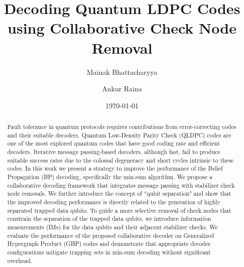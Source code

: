 \documentclass[%
 reprint,
 amsmath,amssymb,
 aps,
pra,
showkeys,
]{revtex4-2}
\begin{document}

\title{Decoding Quantum LDPC Codes using Collaborative Check Node Removal}

\author{Mainak Bhattacharyya}
\author{Ankur Raina}%
%




\date{\today}%

\begin{abstract}
   Fault tolerance in quantum protocols requires contributions from error-correcting codes and their suitable decoders.
   Quantum Low-Density Parity Check (QLDPC) codes are one of the most explored quantum codes that have good coding rate and efficient decoders.
   Iterative message passing-based decoders, although fast, fail to produce suitable success rates due to the colossal degeneracy and short cycles intrinsic to these codes.
   In this work we present a strategy to improve the performance of the Belief Propagation (BP) decoding, specifically the min-sum algorithm.
   We propose a collaborative decoding framework that integrates message passing with stabilizer check node removals.
   We further introduce the concept of ``qubit separation" and show that the improved decoding performance is directly related to the generation of highly separated trapped data qubits.
   To guide a more selective removal of check nodes that constrain the separation of the trapped data qubits, we introduce information measurements (IMs) for the data qubits and their adjacent stabilizer checks.
   We evaluate the performance of the proposed collaborative decoder on Generalized Hypergraph Product (GHP) codes and demonstrate that appropriate decoder configurations mitigate trapping sets in min-sum decoding without significant overhead.
\end{abstract}
\end{document}
